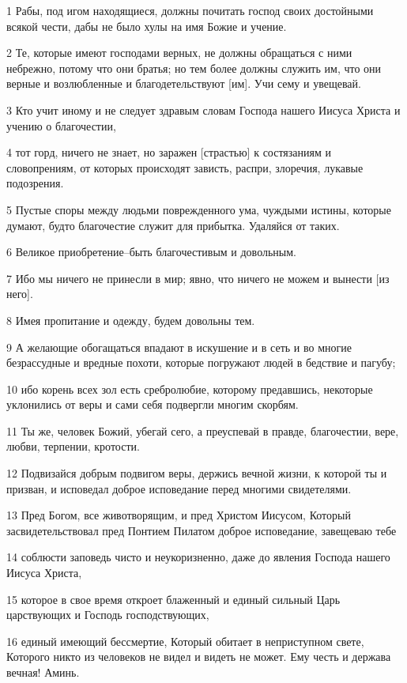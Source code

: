 \par 1 Рабы, под игом находящиеся, должны почитать господ своих достойными всякой чести, дабы не было хулы на имя Божие и учение.
\par 2 Те, которые имеют господами верных, не должны обращаться с ними небрежно, потому что они братья; но тем более должны служить им, что они верные и возлюбленные и благодетельствуют [им]. Учи сему и увещевай.
\par 3 Кто учит иному и не следует здравым словам Господа нашего Иисуса Христа и учению о благочестии,
\par 4 тот горд, ничего не знает, но заражен [страстью] к состязаниям и словопрениям, от которых происходят зависть, распри, злоречия, лукавые подозрения.
\par 5 Пустые споры между людьми поврежденного ума, чуждыми истины, которые думают, будто благочестие служит для прибытка. Удаляйся от таких.
\par 6 Великое приобретение--быть благочестивым и довольным.
\par 7 Ибо мы ничего не принесли в мир; явно, что ничего не можем и вынести [из него].
\par 8 Имея пропитание и одежду, будем довольны тем.
\par 9 А желающие обогащаться впадают в искушение и в сеть и во многие безрассудные и вредные похоти, которые погружают людей в бедствие и пагубу;
\par 10 ибо корень всех зол есть сребролюбие, которому предавшись, некоторые уклонились от веры и сами себя подвергли многим скорбям.
\par 11 Ты же, человек Божий, убегай сего, а преуспевай в правде, благочестии, вере, любви, терпении, кротости.
\par 12 Подвизайся добрым подвигом веры, держись вечной жизни, к которой ты и призван, и исповедал доброе исповедание перед многими свидетелями.
\par 13 Пред Богом, все животворящим, и пред Христом Иисусом, Который засвидетельствовал пред Понтием Пилатом доброе исповедание, завещеваю тебе
\par 14 соблюсти заповедь чисто и неукоризненно, даже до явления Господа нашего Иисуса Христа,
\par 15 которое в свое время откроет блаженный и единый сильный Царь царствующих и Господь господствующих,
\par 16 единый имеющий бессмертие, Который обитает в неприступном свете, Которого никто из человеков не видел и видеть не может. Ему честь и держава вечная! Аминь.
